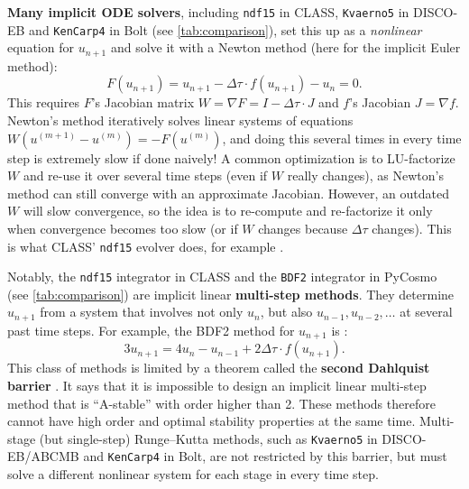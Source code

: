 \documentclass[USenglish, thumbmarks]{uiophdthesis} %
\begin{document}
\textbf{Many implicit ODE solvers},
including \texttt{ndf15} in CLASS, \texttt{Kvaerno5} in DISCO-EB and \texttt{KenCarp4} in Bolt (see \cref{tab:comparison}),
set this up as a \emph{nonlinear} equation for $u_{n+1}$ and solve it with a Newton method
(here for the implicit Euler method):
\begin{equation}
F(u_{n+1}) = u_{n+1} - \Delta\tau \cdot f(u_{n+1}) - u_n = 0.
\end{equation}
This requires $F$'s Jacobian matrix $W = \nabla F = I - \Delta\tau \cdot J$
and $f$'s Jacobian $J = \nabla f$.
Newton's method iteratively solves linear systems of equations $W (u^{(m+1)}-u^{(m)}) = -F(u^{(m)})$,
and doing this several times in every time step is extremely slow if done naively!
A common optimization is to LU-factorize $W$ and re-use it over several time steps (even if $W$ really changes),
as Newton's method can still converge with an approximate Jacobian.
However, an outdated $W$ will slow convergence,
so the idea is to re-compute and re-factorize it only when convergence becomes too slow
(or if $W$ changes because $\Delta \tau$ changes).
This is what CLASS' \texttt{ndf15} evolver does, for example \cite[appendix A]{blasCosmicLinearAnisotropy2011c}.

Notably,
the \texttt{ndf15} integrator in CLASS and the \texttt{BDF2} integrator in PyCosmo
(see \cref{tab:comparison})
are implicit linear \textbf{multi-step methods}.
They determine $u_{n+1}$ from a system that involves not only $u_n$,
but also $u_{n-1}, u_{n-2}, \ldots$ at several past time steps.
For example, the BDF2 method for $u_{n+1}$ is
\cite[equation D36]{nadkarni-ghoshEinsteinBoltzmannEquationsRevisited2017a}:
\begin{equation}
3 u_{n+1} = 4 u_n - u_{n-1} + 2 \Delta\tau \cdot f(u_{n+1}) .
\end{equation}
This class of methods is limited by a theorem called the \textbf{second Dahlquist barrier}
\cite[section V.1]{hairerSolvingOrdinaryDifferential1996}.
It says that it is impossible to design an implicit linear multi-step method that is \enquote{A-stable} with order higher than 2.
These methods therefore cannot have high order and optimal stability properties at the same time.
Multi-stage (but single-step) Runge--Kutta methods,
such as \texttt{Kvaerno5} in DISCO-EB/ABCMB and \texttt{KenCarp4} in Bolt,
are not restricted by this barrier,
but must solve a different nonlinear system for each stage in every time step.
\end{document}
